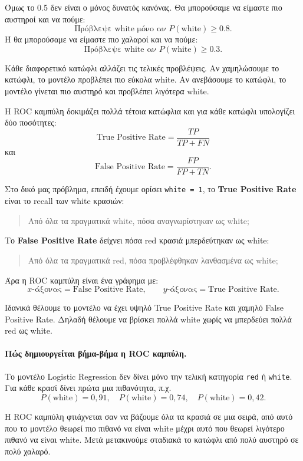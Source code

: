 \documentclass[11pt,a4paper]{article}
\newcommand{\code}[1]{\texttt{#1}}
\begin{document}
Όμως το 0.5 δεν είναι ο μόνος δυνατός κανόνας. Θα μπορούσαμε να είμαστε πιο
αυστηροί και να πούμε:
\[
\text{Πρόβλεψε white μόνο αν } P(\text{white}) \ge 0.8.
\]
Ή θα μπορούσαμε να είμαστε πιο χαλαροί και να πούμε:
\[
\text{Πρόβλεψε white αν } P(\text{white}) \ge 0.3.
\]

Κάθε διαφορετικό κατώφλι αλλάζει τις τελικές προβλέψεις. Αν χαμηλώσουμε το
κατώφλι, το μοντέλο προβλέπει πιο εύκολα white. Αν ανεβάσουμε το κατώφλι,
το μοντέλο γίνεται πιο αυστηρό και προβλέπει λιγότερα white.

Η ROC καμπύλη δοκιμάζει πολλά τέτοια κατώφλια και για κάθε κατώφλι υπολογίζει
δύο ποσότητες:
\[
\text{True Positive Rate} =
\frac{TP}{TP + FN}
\]
και
\[
\text{False Positive Rate} =
\frac{FP}{FP + TN}.
\]

Στο δικό μας πρόβλημα, επειδή έχουμε ορίσει \code{white = 1}, το
\textbf{True Positive Rate} είναι το recall των white κρασιών:
\begin{quote}
Από όλα τα πραγματικά white, πόσα αναγνωρίστηκαν ως white;
\end{quote}

Το \textbf{False Positive Rate} δείχνει πόσα red κρασιά μπερδεύτηκαν ως
white:
\begin{quote}
Από όλα τα πραγματικά red, πόσα προβλέφθηκαν λανθασμένα ως white;
\end{quote}

Άρα η ROC καμπύλη είναι ένα γράφημα με:
\[
x\text{-άξονας} = \text{False Positive Rate},
\qquad
y\text{-άξονας} = \text{True Positive Rate}.
\]

Ιδανικά θέλουμε το μοντέλο να έχει υψηλό True Positive Rate και χαμηλό False
Positive Rate. Δηλαδή θέλουμε να βρίσκει πολλά white χωρίς να μπερδεύει πολλά
red ως white.

\paragraph{Πώς δημιουργείται βήμα-βήμα η ROC καμπύλη.}
Το μοντέλο Logistic Regression δεν δίνει μόνο την τελική κατηγορία
\code{red} ή \code{white}. Για κάθε κρασί δίνει πρώτα μια πιθανότητα, π.χ.
\[
P(\text{white}) = 0{,}91, \quad
P(\text{white}) = 0{,}74, \quad
P(\text{white}) = 0{,}42.
\]

Η ROC καμπύλη φτιάχνεται σαν να βάζουμε όλα τα κρασιά σε μια σειρά, από αυτό
που το μοντέλο θεωρεί πιο πιθανό να είναι white μέχρι αυτό που θεωρεί λιγότερο
πιθανό να είναι white. Μετά μετακινούμε σταδιακά το κατώφλι από πολύ αυστηρό
σε πολύ χαλαρό.
\end{document}
